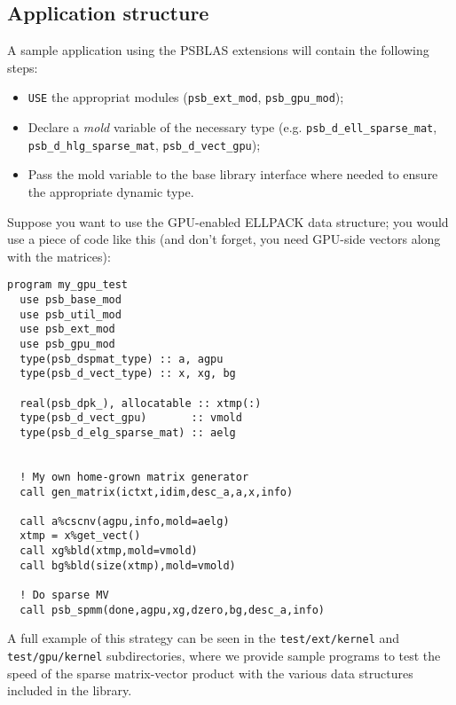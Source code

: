 \subsection{Application structure}
\label{sec:appstruct}
A sample application using the PSBLAS extensions will contain the
following steps:
\begin{itemize}
\item \verb|USE| the appropriat modules (\verb|psb_ext_mod|,
  \verb|psb_gpu_mod|);
\item Declare a \emph{mold} variable of the necessary type
  (e.g. \verb|psb_d_ell_sparse_mat|, \verb|psb_d_hlg_sparse_mat|,
  \verb|psb_d_vect_gpu|);
\item Pass the mold variable to the base library interface where
  needed to ensure the appropriate dynamic type.
\end{itemize}
Suppose you want to use the GPU-enabled ELLPACK data structure; you
would use a piece of code like this (and don't forget, you need
GPU-side vectors along with the matrices):
\lstset{language=Fortran}
\begin{lstlisting}
program my_gpu_test
  use psb_base_mod
  use psb_util_mod 
  use psb_ext_mod
  use psb_gpu_mod
  type(psb_dspmat_type) :: a, agpu
  type(psb_d_vect_type) :: x, xg, bg

  real(psb_dpk_), allocatable :: xtmp(:)
  type(psb_d_vect_gpu)       :: vmold
  type(psb_d_elg_sparse_mat) :: aelg


  ! My own home-grown matrix generator
  call gen_matrix(ictxt,idim,desc_a,a,x,info)
  
  call a%cscnv(agpu,info,mold=aelg)
  xtmp = x%get_vect() 
  call xg%bld(xtmp,mold=vmold)
  call bg%bld(size(xtmp),mold=vmold)
  
  ! Do sparse MV
  call psb_spmm(done,agpu,xg,dzero,bg,desc_a,info)
\end{lstlisting}
A full example of this strategy can be seen in the
\verb|test/ext/kernel| and \verb|test/gpu/kernel| subdirectories,
where we provide  sample programs 
to test the speed of the sparse matrix-vector product with the various
data structures included in the library. 





